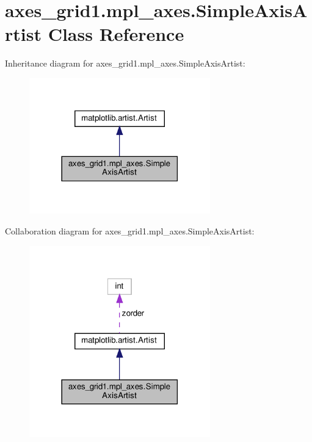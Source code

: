 \hypertarget{classaxes__grid1_1_1mpl__axes_1_1SimpleAxisArtist}{}\section{axes\+\_\+grid1.\+mpl\+\_\+axes.\+Simple\+Axis\+Artist Class Reference}
\label{classaxes__grid1_1_1mpl__axes_1_1SimpleAxisArtist}


Inheritance diagram for axes\+\_\+grid1.\+mpl\+\_\+axes.\+Simple\+Axis\+Artist\+:
\nopagebreak
\begin{figure}[H]
\begin{center}
\leavevmode
\includegraphics[width=222pt]{classaxes__grid1_1_1mpl__axes_1_1SimpleAxisArtist__inherit__graph}
\end{center}
\end{figure}


Collaboration diagram for axes\+\_\+grid1.\+mpl\+\_\+axes.\+Simple\+Axis\+Artist\+:
\nopagebreak
\begin{figure}[H]
\begin{center}
\leavevmode
\includegraphics[width=222pt]{classaxes__grid1_1_1mpl__axes_1_1SimpleAxisArtist__coll__graph}
\end{center}
\end{figure}
